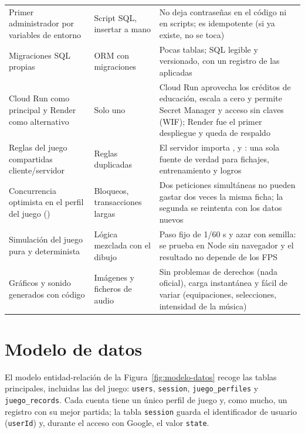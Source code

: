 \begin{longtable}{@{}L{2.8cm} L{3.2cm} L{6.5cm}@{}}
Primer administrador por variables de entorno & Script SQL, insertar a mano & No deja contraseñas en el código ni en scripts; es idempotente (si ya existe, no se toca) \\
Migraciones SQL propias & ORM con migraciones & Pocas tablas; SQL legible y versionado, con un registro de las aplicadas \\
Cloud Run como principal y Render como alternativo & Solo uno & Cloud Run aprovecha los créditos de educación, escala a cero y permite Secret Manager y acceso sin claves (WIF); Render fue el primer despliegue y queda de respaldo \\
Reglas del juego compartidas cliente/servidor & Reglas duplicadas & El servidor importa ,  y : una sola fuente de verdad para fichajes, entrenamiento y logros \\
Concurrencia optimista en el perfil del juego () & Bloqueos, transacciones largas & Dos peticiones simultáneas no pueden gastar dos veces la misma ficha; la segunda se reintenta con los datos nuevos \\
Simulación del juego pura y determinista & Lógica mezclada con el dibujo & Paso fijo de 1/60 s y azar con semilla: se prueba en Node sin navegador y el resultado no depende de los FPS \\
Gráficos y sonido generados con código & Imágenes y ficheros de audio & Sin problemas de derechos (nada oficial), carga instantánea y fácil de variar (equipaciones, selecciones, intensidad de la música) \\*
\bottomrule
\end{longtable}

\section{Modelo de datos}
\label{sec:modelo-datos}

El modelo entidad-relación de la Figura~\ref{fig:modelo-datos} recoge las tablas principales, incluidas las del juego: \texttt{users}, \texttt{session}, \texttt{juego\_perfiles} y \texttt{juego\_records}. Cada cuenta tiene un único perfil de juego y, como mucho, un registro con su mejor partida; la tabla \texttt{session} guarda el identificador de usuario (\texttt{userId}) y, durante el acceso con Google, el valor \texttt{state}.

